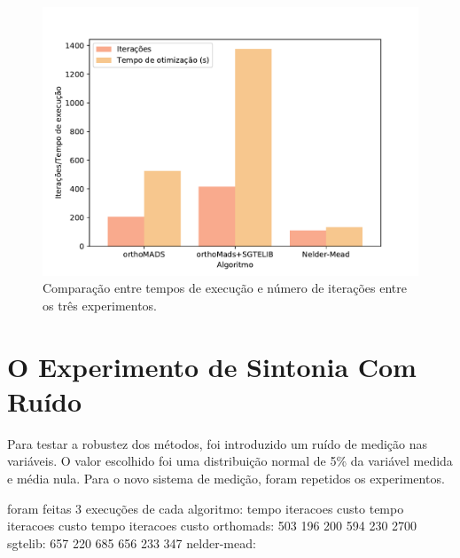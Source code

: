 \begin{figure}
\centering
  \includegraphics[width=0.7\linewidth]{figs/comp_time_iter.pdf}
  \caption{Comparação entre tempos de execução e número de iterações entre os três experimentos.}
  \label{fig:comp1}
\end{figure}


\chapter{O Experimento de Sintonia Com Ruído}

Para testar a robustez dos métodos, foi introduzido um ruído de medição nas variáveis. 
O valor escolhido foi uma distribuição normal de 5\% da variável medida e média nula.
Para o novo sistema de medição, foram repetidos os experimentos.

foram feitas 3 execuções de cada algoritmo:
			tempo iteracoes	custo   tempo iteracoes custo 	tempo iteracoes custo
orthomads:  503      196     200    594     230       2700
sgtelib:    657      220     685   656      233       347
nelder-mead:



